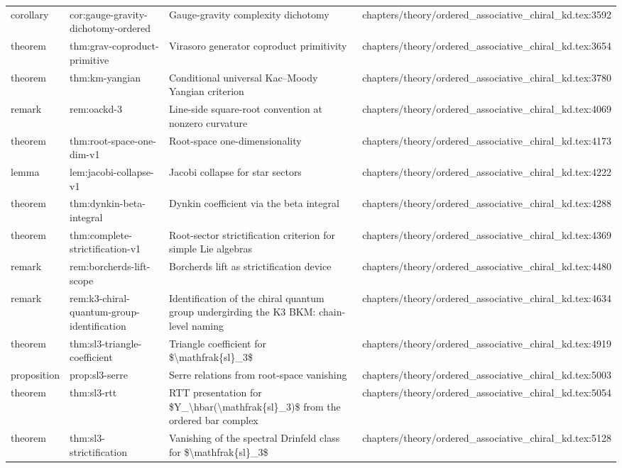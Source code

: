 \documentclass[11pt]{article}
\begin{document}
\begin{longtable}{L{0.10\textwidth}L{0.26\textwidth}L{0.42\textwidth}L{0.22\textwidth}}
corollary & cor:gauge-gravity-dichotomy-ordered & Gauge-gravity complexity dichotomy & chapters/theory/ordered\_associative\_chiral\_kd.tex:3592\\
theorem & thm:grav-coproduct-primitive & Virasoro generator coproduct primitivity & chapters/theory/ordered\_associative\_chiral\_kd.tex:3654\\
theorem & thm:km-yangian & Cond{}itional universal Kac--Moody Yangian criterion & chapters/theory/ordered\_associative\_chiral\_kd.tex:3780\\
remark & rem:oackd-3 & Line-side square-root convention at nonzero curvature & chapters/theory/ordered\_associative\_chiral\_kd.tex:4069\\
theorem & thm:root-space-one-dim-v1 & Root-space one-dimensionality & chapters/theory/ordered\_associative\_chiral\_kd.tex:4173\\
lemma & lem:jacobi-collapse-v1 & Jacobi collapse for star sectors & chapters/theory/ordered\_associative\_chiral\_kd.tex:4222\\
theorem & thm:dynkin-beta-integral & Dynkin coefficient via the beta integral & chapters/theory/ordered\_associative\_chiral\_kd.tex:4288\\
theorem & thm:complete-strictification-v1 & Root-sector strictification criterion for simple Lie algebras & chapters/theory/ordered\_associative\_chiral\_kd.tex:4369\\
remark & rem:borcherds-lift-scope & Borcherds lift as strictification device & chapters/theory/ordered\_associative\_chiral\_kd.tex:4480\\
remark & rem:k3-chiral-quantum-group-identification & Identification of the chiral quantum group undergirding the K3 BKM: chain-level naming & chapters/theory/ordered\_associative\_chiral\_kd.tex:4634\\
theorem & thm:sl3-triangle-coefficient & Triangle coefficient for \$\textbackslash{}mathfrak\{sl\}\_3\$ & chapters/theory/ordered\_associative\_chiral\_kd.tex:4919\\
proposition & prop:sl3-serre & Serre relations from root-space vanishing & chapters/theory/ordered\_associative\_chiral\_kd.tex:5003\\
theorem & thm:sl3-rtt & RTT presentation for \$Y\_\textbackslash{}hbar(\textbackslash{}mathfrak\{sl\}\_3)\$ from the ordered bar complex & chapters/theory/ordered\_associative\_chiral\_kd.tex:5054\\
theorem & thm:sl3-strictification & Vanishing of the spectral Drinfeld class for \$\textbackslash{}mathfrak\{sl\}\_3\$ & chapters/theory/ordered\_associative\_chiral\_kd.tex:5128\\

\end{longtable}
\end{document}
